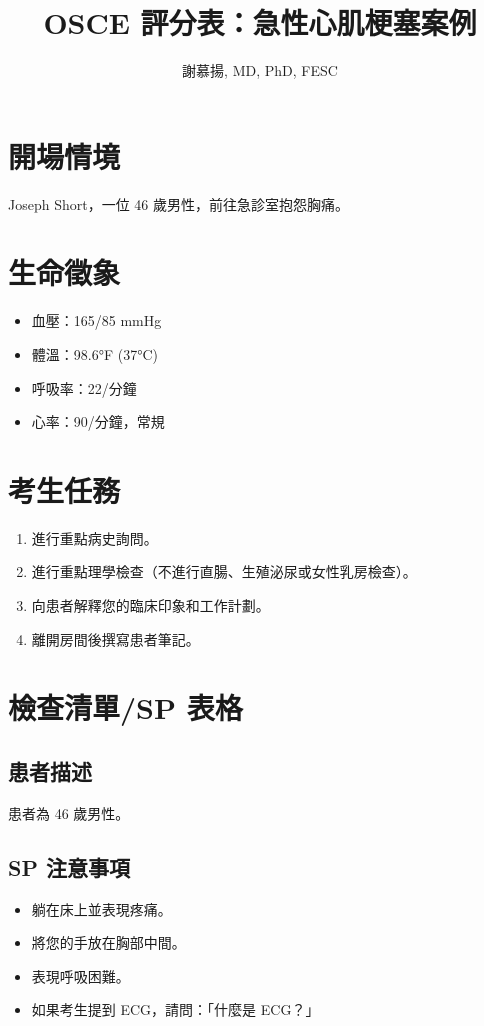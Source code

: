 \documentclass{article}
\newcommand{\mydate}{\DTMtoday}
\begin{document}
\title{OSCE 評分表：急性心肌梗塞案例}
\author{謝慕揚, MD, PhD, FESC}
\date{\mydate}
\maketitle

\section{開場情境}
Joseph Short，一位 46 歲男性，前往急診室抱怨胸痛。

\section{生命徵象}
\begin{itemize}
\item 血壓：165/85 mmHg
\item 體溫：98.6°F (37°C)
\item 呼吸率：22/分鐘
\item 心率：90/分鐘，常規
\end{itemize}

\section{考生任務}
\begin{enumerate}
\item 進行重點病史詢問。
\item 進行重點理學檢查（不進行直腸、生殖泌尿或女性乳房檢查）。
\item 向患者解釋您的臨床印象和工作計劃。
\item 離開房間後撰寫患者筆記。
\end{enumerate}

\section{檢查清單/SP 表格}

\subsection{患者描述}
患者為 46 歲男性。

\subsection{SP 注意事項}
\begin{itemize}
\item 躺在床上並表現疼痛。
\item 將您的手放在胸部中間。
\item 表現呼吸困難。
\item 如果考生提到 ECG，請問：「什麼是 ECG？」
\end{itemize}
\end{document}
